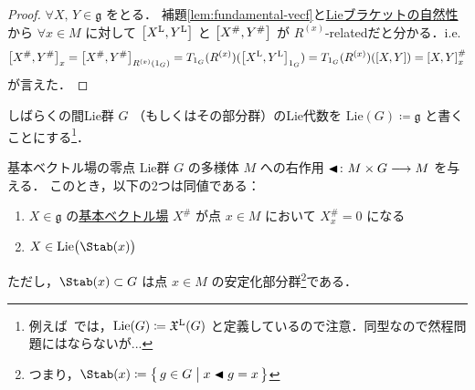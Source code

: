 \documentclass[geometry_main]{subfiles}
\begin{document}
\begin{proof}
    $\forall X,\, Y \in \mathfrak{g}$ をとる．
    補題\ref{lem:fundamental-vecf}と\hyperref[prop:Lie-bracket-natural]{Lieブラケットの自然性}から $\forall x \in M$ に対して $\comm{\Lie{X}}{\Lie{Y}}$ と $\comm{X^\#}{Y^\#}$ が $R^{(x)}$-relatedだと分かる．i.e.
    \begin{align}
        \comm{X^\#}{Y^\#}_x = \comm{X^\#}{Y^\#}_{R^{(x)}(1_G)} = T_{1_G} (R^{(x)}) (\comm{\Lie{X}}{\Lie{Y}}_{1_G}) = T_{1_G} (R^{(x)}) (\comm{X}{Y}) = \comm{X}{Y}^\#_x
    \end{align}
    が言えた．
\end{proof}

しばらくの間Lie群 $G$ （もしくはその部分群）のLie代数を $\mathrm{Lie}(G) \coloneqq \mathfrak{g}$ と書くことにする\footnote{例えば~\cite{Lee12}では，$\mathrm{Lie}(G) \coloneqq \mathfrak{X}^{\mathrm{L}}(G)$ と定義しているので注意．同型なので然程問題にはならないが...}．

\begin{myprop}[label=prop:fundamental-vecf-basic]{基本ベクトル場の零点}
    Lie群 $G$ の\cinfty 多様体 $M$ への右作用 $\blacktriangleleft \colon M \times G \longrightarrow M$ を与える．
    このとき，以下の2つは同値である：
    \begin{enumerate}
        \item $X \in \mathfrak{g}$ の\hyperref[def:fundamental-vecf]{基本ベクトル場} $X^\#$ が点 $x \in M$ において $X^\#_x = 0$ になる
        \item $X \in \mathrm{Lie}\bigl(\Stab (x)\bigr)$
    \end{enumerate}
    ただし，$\Stab (x) \subset G$ は点 $x \in M$ の安定化部分群\footnote{つまり，$\Stab (x) \coloneqq \bigl\{\, g \in G \bigm| x \btl g = x \,\bigr\}$ }である．
\end{myprop}
\end{document}
